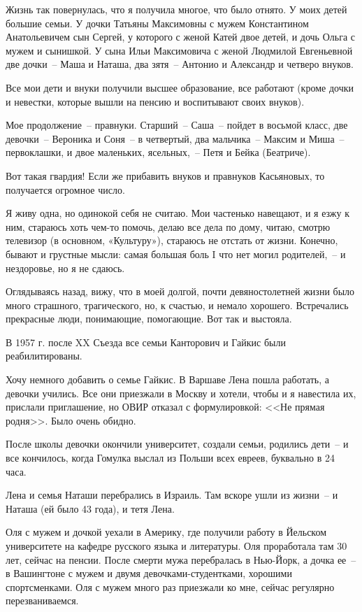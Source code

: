 Жизнь  так повернулась,  что  я  получила многое,  что было отнято.  У  моих 
детей  большие  семьи.  У дочки  Татьяны  Максимовны  с мужем  Константином 
Анатольевичем  сын Сергей,  у которого с женой Катей  двое детей, и  дочь Ольга  с мужем  и  сынишкой. У сына  Ильи Максимовича с женой  Людмилой  Евгеньевной 
две дочки~--  Маша и Наташа,  два  зятя~--  Антонио  и  Александр  и четверо внуков.

Все  мои  дети  и  внуки получили  высшее образование,  все  работают  (кроме 
дочки и невестки, которые вышли на пенсию и воспитывают своих  внуков).

Мое  продолжение~-- правнуки.  Старший~-- Саша~--  пойдет  в  восьмой  класс, 
две девочки~-- Вероника и Соня~-- в четвертый,  два  мальчика~-- Максим  и  Миша~-- 
первоклашки, и двое маленьких, ясельных,~--  Петя и Бейка (Беатриче).

Вот  такая  гвардия!  Если же  прибавить внуков и правнуков  Касьяновых,  то 
получается огромное число.

Я живу  одна,  но  одинокой  себя  не считаю. Мои  частенько  навещают, и  я 
езжу  к  ним,  стараюсь  хоть  чем-то помочь,  делаю  все  дела по  дому,  читаю, 
смотрю  телевизор  (в основном, «Культуру»),  стараюсь  не  отстать  от  жизни. 
Конечно, бывают  и  грустные  мысли:  самая  большая  боль  I  что  нет  могил 
родителей,~-- и нездоровье, но я не сдаюсь.

Оглядываясь  назад, вижу, что в  моей  долгой, почти  девяностолетней  жизни 
было  много  страшного,  трагического,  но,  к  счастью,  и  немало  хорошего. 
Встречались прекрасные люди, понимающие, помогающие. Вот так и выстояла.

В  1957 г.  после  XX  Съезда  все  семьи  Канторович  и  Гайкис  были 
реабилитированы.

Хочу  немного  добавить  о семье  Гайкис.  В Варшаве Лена пошла работать, а 
девочки учились. Все  они приезжали в Москву и хотели,  чтобы  и  я навестила их, 
прислали  приглашение, но  ОВИР отказал  с  формулировкой:  <<Не прямая родня>>. 
Было очень обидно.

После школы девочки окончили университет, создали  семьи,  родились  дети~-- 
и все  кончилось, когда  Гомулка выслал  из  Польши  всех евреев, буквально в 24 
часа.

Лена и  семья  Наташи  перебрались  в Израиль. Там вскоре ушли из жизни~--  и 
Наташа (ей было 43 года), и тетя Лена.

Оля с мужем и дочкой уехали в  Америку,  где  получили  работу в Йельском 
университете  на кафедре  русского языка  и литературы.  Оля проработала там 30 
лет, сейчас на пенсии. После смерти мужа перебралась  в Нью-Йорк, а дочка ее~--  в 
Вашингтоне с мужем и двумя девочками-студентками,  хорошими спортсменками. 
Оля с мужем много раз приезжали ко мне, сейчас регулярно перезваниваемся.